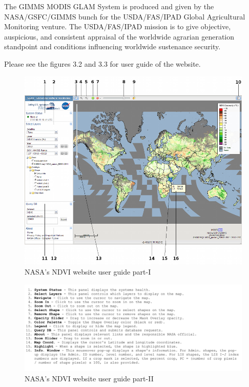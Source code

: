 The GIMMS MODIS GLAM System is produced and given by the NASA/GSFC/GIMMS bunch for the USDA/FAS/IPAD Global Agricultural Monitoring venture. The USDA/FAS/IPAD mission is to give objective, auspicious, and consistent appraisal of the worldwide agrarian generation standpoint and conditions influencing worldwide sustenance security.

Please see the figures 3.2 and 3.3 for user guide of the website.

    \begin{figure}[H]
            \centering
            \includegraphics[width=1.0\linewidth]{figures/ch3/nasa_website_1.png}
            \caption{\label{fig:nasa_website_1} NASA's NDVI website user guide part-I \cite{GAM}}
    \end{figure}
    
    
    \begin{figure}[H]
            \centering
            \includegraphics[width=1.0\linewidth]{figures/ch3/nasa_website_2.png}
            \caption{\label{fig:nasa_website_2} NASA's NDVI website user guide part-II \cite{GAM}}
    \end{figure}    



